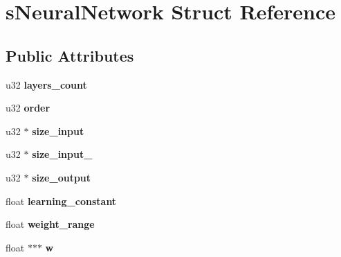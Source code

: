 \hypertarget{structsNeuralNetwork}{\section{s\-Neural\-Network Struct Reference}
\label{structsNeuralNetwork}
}
\subsection*{Public Attributes}
\begin{DoxyCompactItemize}
\item 
\hypertarget{structsNeuralNetwork_ae70c71dabeb927ba5e375208bd6e9a66}{u32 {\bfseries layers\-\_\-count}}\label{structsNeuralNetwork_ae70c71dabeb927ba5e375208bd6e9a66}

\item 
\hypertarget{structsNeuralNetwork_aa425ee3d56e13661dce5f34c479f798c}{u32 {\bfseries order}}\label{structsNeuralNetwork_aa425ee3d56e13661dce5f34c479f798c}

\item 
\hypertarget{structsNeuralNetwork_a227c146a256519503657c80790cf11a5}{u32 $\ast$ {\bfseries size\-\_\-input}}\label{structsNeuralNetwork_a227c146a256519503657c80790cf11a5}

\item 
\hypertarget{structsNeuralNetwork_a429a03c98bb824fb2bdcd7649376741e}{u32 $\ast$ {\bfseries size\-\_\-input\-\_\-}}\label{structsNeuralNetwork_a429a03c98bb824fb2bdcd7649376741e}

\item 
\hypertarget{structsNeuralNetwork_ae383e858cd9d9361410d88d5004528c6}{u32 $\ast$ {\bfseries size\-\_\-output}}\label{structsNeuralNetwork_ae383e858cd9d9361410d88d5004528c6}

\item 
\hypertarget{structsNeuralNetwork_a81f438dae1a676730e3b99643ea4a3e6}{float {\bfseries learning\-\_\-constant}}\label{structsNeuralNetwork_a81f438dae1a676730e3b99643ea4a3e6}

\item 
\hypertarget{structsNeuralNetwork_aff7a0e1da9e3b24efb8d3e6d6df3713b}{float {\bfseries weight\-\_\-range}}\label{structsNeuralNetwork_aff7a0e1da9e3b24efb8d3e6d6df3713b}

\item 
\hypertarget{structsNeuralNetwork_ad5d72b18f56aec7bdbc1c837b57e8487}{float $\ast$$\ast$$\ast$ {\bfseries w}}\label{structsNeuralNetwork_ad5d72b18f56aec7bdbc1c837b57e8487}


\end{DoxyCompactItemize}
